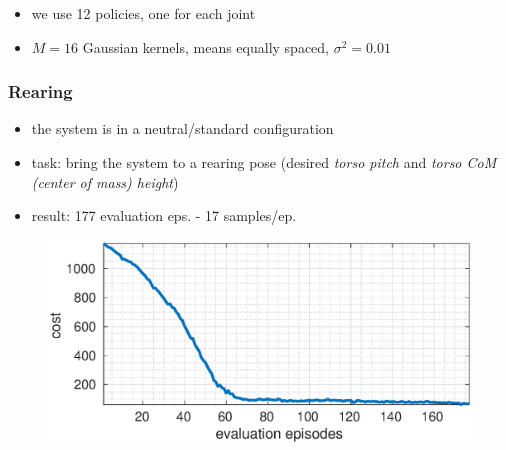 \documentclass[11pt]{beamer}
\begin{document}
\begin{frame}
\begin{figure}
 \end{figure}
 \vspace*{-5mm}
  \begin{itemize}\small
   \item we use 12 policies, one for each joint
   \item $M=16$ Gaussian kernels, means equally spaced, $\sigma^2 = 0.01$
  \end{itemize}

\end{frame}


\begin{frame}\frametitle{\color{black} Rearing}
  \begin{itemize}\small
  \item the system is in a neutral/standard configuration
  \item task: bring the system to a rearing pose (desired \textit{torso pitch} and \textit{torso CoM 
(center of mass) height})
 \pause
  \item result: 177 evaluation eps. - 17 samples/ep.
 \end{itemize}
 
 \vspace*{-5mm}
 \begin{figure}
 \centering
 \includegraphics[scale=.32]{sr_cost_1_ICRA.eps} 
 \end{figure}
 
\end{frame}
\end{document}
